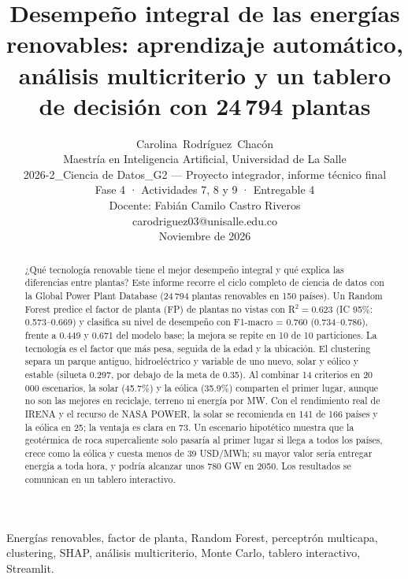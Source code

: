 \documentclass[journal,letterpaper]{IEEEtran}
\begin{document}
\title{Desempeño integral de las energías renovables: aprendizaje automático, análisis multicriterio y un tablero de decisión con 24\,794 plantas}

\author{Carolina~Rodríguez~Chacón\\
Maestría en Inteligencia Artificial, Universidad de La Salle\\
2026-2\_Ciencia de Datos\_G2 --- Proyecto integrador, informe técnico final\\
Fase 4 · Actividades 7, 8 y 9 · Entregable 4\\
Docente: Fabián Camilo Castro Riveros\\
carodriguez03@unisalle.edu.co\\
Noviembre de 2026}

\maketitle

\begin{abstract}
¿Qué tecnología renovable tiene el mejor desempeño integral y qué explica las diferencias entre plantas? Este informe recorre el ciclo completo de ciencia de datos con la Global Power Plant Database (24\,794 plantas renovables en 150 países). Un Random Forest predice el factor de planta (FP) de plantas no vistas con R$^2 = 0.623$ (IC 95\%: 0.573--0.669) y clasifica su nivel de desempeño con F1-macro = 0.760 (0.734--0.786), frente a 0.449 y 0.671 del modelo base; la mejora se repite en 10 de 10 particiones. La tecnología es el factor que más pesa, seguida de la edad y la ubicación. El clustering separa un parque antiguo, hidroeléctrico y variable de uno nuevo, solar y eólico y estable (silueta 0.297, por debajo de la meta de 0.35). Al combinar 14 criterios en 20\,000 escenarios, la solar (45.7\%) y la eólica (35.9\%) comparten el primer lugar, aunque no son las mejores en reciclaje, terreno ni energía por MW. Con el rendimiento real de IRENA y el recurso de NASA POWER, la solar se recomienda en 141 de 166 países y la eólica en 25; la ventaja es clara en 73. Un escenario hipotético muestra que la geotérmica de roca supercaliente solo pasaría al primer lugar si llega a todos los países, crece como la eólica y cuesta menos de 39 USD/MWh; su mayor valor sería entregar energía a toda hora, y podría alcanzar unos 780 GW en 2050. Los resultados se comunican en un tablero interactivo.
\end{abstract}

\begin{IEEEkeywords}
Energías renovables, factor de planta, Random Forest, perceptrón multicapa, clustering, SHAP, análisis multicriterio, Monte Carlo, tablero interactivo, Streamlit.
\end{IEEEkeywords}
\end{document}

